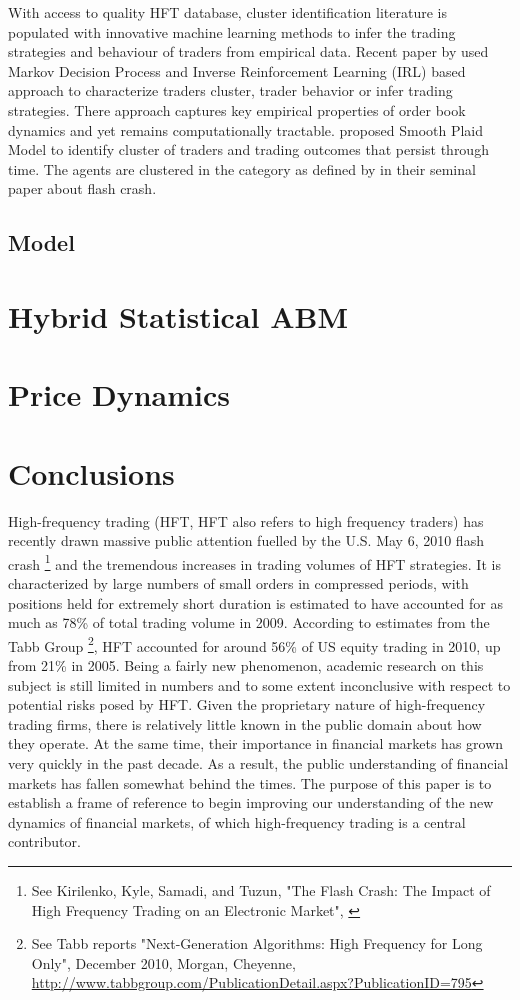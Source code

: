 \documentclass[12pt,a4paper]{article}
\numberwithin{equation}{section}
\numberwithin{figure}{section}
\numberwithin{table}{section}
\begin{document}
With access to quality HFT database, cluster identification literature is populated with innovative machine learning methods to infer the trading strategies and behaviour of traders from empirical data. Recent paper by \citet{KirilenkoYangPaddrikHaynesToddBelingScherer2011} used Markov Decision Process and Inverse Reinforcement
Learning (IRL) based approach to characterize traders cluster, trader behavior or infer trading strategies. There approach captures key empirical properties of order book dynamics and yet remains computationally tractable. \citet{ShawnMichailidiszKirilenko2011} proposed Smooth Plaid Model to identify cluster of traders and trading outcomes that persist through time. The agents are clustered in the category as defined by \citet{kirilenko2010} in their seminal paper about flash crash. 
\subsection{Model}

\section{Hybrid Statistical ABM}
\section{Price Dynamics}
\section{Conclusions}
High-frequency trading (HFT, HFT also refers to high frequency traders) has recently drawn massive public attention fuelled by the U.S. May 6, 2010 flash crash \footnote{See Kirilenko, Kyle, Samadi, and Tuzun, "The Flash Crash: The Impact of High Frequency Trading on an Electronic Market", \citet{kirilenko2010}} and the tremendous increases in trading volumes of HFT strategies. It is characterized by large numbers of small orders in compressed periods, with positions held for extremely short duration is estimated to have accounted for as much as 78\% of total trading volume in 2009. According to estimates from the Tabb Group \footnote{See Tabb reports "Next-Generation Algorithms: High Frequency for Long Only", December 2010, Morgan, Cheyenne, \url{http://www.tabbgroup.com/PublicationDetail.aspx?PublicationID=795}}, HFT accounted for around 56\% of US equity trading in 2010, up from 21\% in 2005. Being a fairly new phenomenon, academic research on this subject is still limited in numbers and to some extent inconclusive with respect to potential risks posed by HFT. Given the proprietary nature of high-frequency trading firms, there is relatively little known in the public domain about how they operate. At the same time, their importance in financial markets has grown very quickly in the past decade. As a result, the public understanding of financial markets has fallen somewhat behind the times. The purpose of this paper is to establish a frame of reference to begin improving our understanding of the new dynamics of financial markets, of which high-frequency trading is a central contributor.
\end{document}

